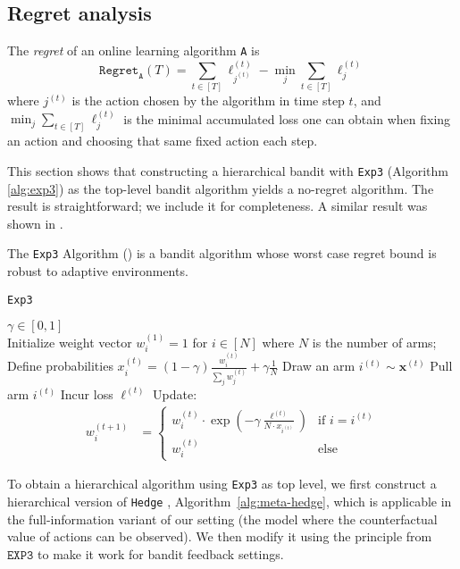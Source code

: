 \subsection{Regret analysis}

\begin{defn}[Regret]
   The \emph{regret} of an online learning algorithm \texttt{A} is
   $$\texttt{Regret}_\texttt{A}(T) = \sum_{t\in[T]}\ell_{j^{(t)}}^{(t)}  - \min_j\sum_{t\in[T]}\ell_j^{(t)}$$
   where $j^{(t)}$ is the action chosen by the algorithm in time step $t$, and $\min_j\sum_{t\in[T]}\ell_j^{(t)}$ is the minimal accumulated loss one can obtain when fixing an action and choosing that same fixed action each step.
\end{defn}
	

This section shows that constructing a hierarchical bandit with \texttt{Exp3} (Algorithm \ref{alg:exp3}) as the top-level bandit algorithm yields a no-regret algorithm. The result is straightforward; we include it for completeness. A similar result was shown in \cite{chang:05}. 

The \texttt{Exp3} Algorithm (\cite{auer:02b}) is a bandit algorithm whose worst case regret bound is robust to adaptive environments.

\begin{algorithm}
   \caption{\texttt{Exp3}}
   \label{alg:exp3}
   \begin{algorithmic}  
       $\gamma\in[0,1]$\\
   \STATE Initialize weight vector $w^{(1)}_{i}=1$ for $i\in[N]$ where $N$ is the number of arms;
	   \STATE Define probabilities $x_i^{(t)} = (1-\gamma)\frac{w_i^{(t)}}{ \sum_j w_{j}^{(t)} } + \gamma\frac{1}{N}$
	   \STATE Draw an arm $i^{(t)} \sim\mathbf{x}^{(t)}$
	\STATE Pull arm $i^{(t)} $
	   \STATE Incur loss $\ell^{(t)}$
	   \STATE Update:
	   \begin{align}
		w^{(t+1)}_i & = \begin{cases}
		   w_{i}^{(t)} \cdot \exp(-\gamma \frac{\ell^{(t)}}{N\cdot x_{i^{(t)}}})
			 & \text{if } i=i^{(t)} \\
			w^{(t)}_{i} & \text{else}
		\end{cases}		
		\end{align}
    \ENDFOR
       	\end{algorithmic}
\end{algorithm}         
 
To obtain a hierarchical algorithm using \texttt{Exp3} as top level, we first construct a hierarchical version of \texttt{Hedge} \citep{littlestone1994weighted, freund1997decision}, Algorithm~\ref{alg:meta-hedge}, which is applicable in the full-information variant of our setting (the model where the counterfactual value of actions can be observed). We then modify it using the principle from $\texttt{EXP3}$ to make it work for bandit feedback settings.

